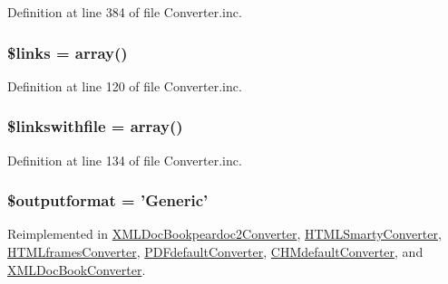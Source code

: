 \-Definition at line 384 of file \-Converter.\-inc.

\hypertarget{class_converter_a4ca8be3ff3cf95aa3af546449c1f1bec}{
\subsubsection[{\$links}]{\setlength{\rightskip}{0pt plus 5cm}\$links = array()}}\label{class_converter_a4ca8be3ff3cf95aa3af546449c1f1bec}


\-Definition at line 120 of file \-Converter.\-inc.

\hypertarget{class_converter_a89c203d50b13055a05a27bd0baf34a8d}{
\subsubsection[{\$linkswithfile}]{\setlength{\rightskip}{0pt plus 5cm}\$linkswithfile = array()}}\label{class_converter_a89c203d50b13055a05a27bd0baf34a8d}


\-Definition at line 134 of file \-Converter.\-inc.

\hypertarget{class_converter_af0bfe153c049d957e8ea29b147025108}{
\subsubsection[{\$outputformat}]{\setlength{\rightskip}{0pt plus 5cm}\$outputformat = '\-Generic'}}\label{class_converter_af0bfe153c049d957e8ea29b147025108}


\-Reimplemented in \hyperlink{class_x_m_l_doc_bookpeardoc2_converter_af0bfe153c049d957e8ea29b147025108}{\-X\-M\-L\-Doc\-Bookpeardoc2\-Converter}, \hyperlink{class_h_t_m_l_smarty_converter_af0bfe153c049d957e8ea29b147025108}{\-H\-T\-M\-L\-Smarty\-Converter}, \hyperlink{class_h_t_m_lframes_converter_af0bfe153c049d957e8ea29b147025108}{\-H\-T\-M\-Lframes\-Converter}, \hyperlink{class_p_d_fdefault_converter_af0bfe153c049d957e8ea29b147025108}{\-P\-D\-Fdefault\-Converter}, \hyperlink{class_c_h_mdefault_converter_af0bfe153c049d957e8ea29b147025108}{\-C\-H\-Mdefault\-Converter}, and \hyperlink{class_x_m_l_doc_book_converter_af0bfe153c049d957e8ea29b147025108}{\-X\-M\-L\-Doc\-Book\-Converter}.



